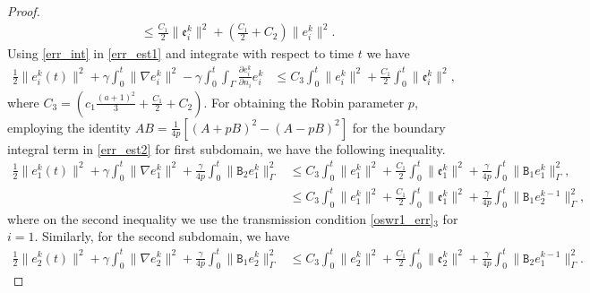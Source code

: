 \documentclass[11pt]{article}
\begin{document}
\begin{proof}
\begin{equation}
\begin{aligned}
&\leq \frac{C_1}{2} \parallel \mathfrak{e}_i^{k}\parallel^2 + \left( \frac{C_1}{2} + C_2\right) \parallel e_i^{k}\parallel^2.
\end{aligned}
\end{equation}
Using \eqref{err_int} in \eqref{err_est1} and integrate with respect to time $t$ we have
\begin{equation}\label{err_est2}
\begin{aligned}
\frac{1}{2}\parallel e_i^{k}(t)\parallel^2 + \gamma\int_0^t\parallel\nabla e_i^{k} \parallel^2 -\gamma\int_0^t\int_{\Gamma} \frac{\partial e_i^{k}}{\partial n_i} e_i^{k} 
& \leq C_3 \int_0^t\parallel e_i^{k}\parallel^2 + \frac{C_1}{2} \int_0^t\parallel \mathfrak{e}_i^{k}\parallel^2,
\end{aligned}
\end{equation} 
where $C_3=\left( c_1\frac{(a+1)^2}{3}+\frac{C_1}{2} + C_2 \right)$. For obtaining the Robin parameter $p$, employing the identity $AB=\frac{1}{4p}\left[ (A+pB)^2 - (A-pB)^2\right]$ for the boundary integral term in \eqref{err_est2} for first subdomain, we have the following inequality. 
\begin{equation}\label{err_est3}
\begin{aligned}
\frac{1}{2}\parallel e_1^{k}(t)\parallel^2 + \gamma\int_0^t\parallel\nabla e_1^{k} \parallel^2 +\frac{\gamma}{4p}\int_0^t\parallel\mathtt{B}_2 e_1^{k}\parallel_{\Gamma}^2
& \leq C_3 \int_0^t\parallel e_1^{k}\parallel^2 + \frac{C_1}{2} \int_0^t\parallel \mathfrak{e}_1^{k}\parallel^2
 + \frac{\gamma}{4p}\int_0^t\parallel\mathtt{B}_1 e_1^{k}\parallel_{\Gamma}^2,\\
& \leq C_3 \int_0^t\parallel e_1^{k}\parallel^2 + \frac{C_1}{2} \int_0^t\parallel \mathfrak{e}_1^{k}\parallel^2
 + \frac{\gamma}{4p}\int_0^t\parallel\mathtt{B}_1 e_2^{k-1}\parallel_{\Gamma}^2,
\end{aligned}
\end{equation} 
where on the second inequality we use the transmission condition \eqref{oswr1_err}$_3$ for $i=1$. Similarly, for the second subdomain, we have 
\begin{equation}\label{err_est4}
\begin{aligned}
\frac{1}{2}\parallel e_2^{k}(t)\parallel^2 + \gamma\int_0^t\parallel\nabla e_2^{k} \parallel^2 +\frac{\gamma}{4p}\int_0^t\parallel\mathtt{B}_1 e_2^{k}\parallel_{\Gamma}^2
& \leq C_3 \int_0^t\parallel e_2^{k}\parallel^2 + \frac{C_1}{2} \int_0^t\parallel \mathfrak{e}_2^{k}\parallel^2
 + \frac{\gamma}{4p}\int_0^t\parallel\mathtt{B}_2 e_1^{k-1}\parallel_{\Gamma}^2.

\end{aligned}
\end{equation}
\end{proof}
\end{document}

